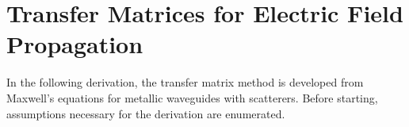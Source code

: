 \chapter{Transfer Matrices for Electric Field Propagation}
\label{sec:appendix_derivation_transfer_matrices_quasi1d}

In the following derivation, the transfer matrix method\cite{1981_MacKinnon_scaling}\cite{1992_Pendry}\cite{2003_Kettemann} is developed from Maxwell's equations\cite{1999_Jackson} for metallic waveguides with scatterers. Before starting, assumptions necessary for the derivation are enumerated. 
